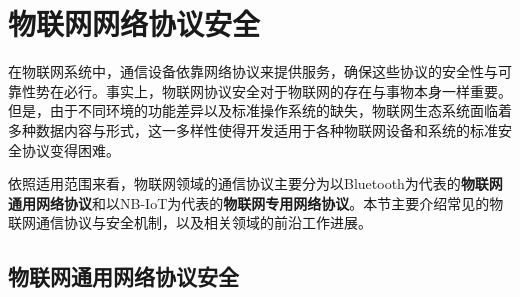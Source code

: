 \section{物联网网络协议安全}
\label{protocol_security}

\par 在物联网系统中，通信设备依靠网络协议来提供服务，确保这些协议的安全性与可靠性势在必行。事实上，物联网协议安全对于物联网的存在与事物本身一样重要。但是，由于不同环境的功能差异以及标准操作系统的缺失，物联网生态系统面临着多种数据内容与形式，这一多样性使得开发适用于各种物联网设备和系统的标准安全协议变得困难。
\par 依照适用范围来看，物联网领域的通信协议主要分为以Bluetooth为代表的\textcolor{myblue}{\textbf{物联网通用网络协议}}和以NB-IoT为代表的\textcolor{myblue}{\textbf{物联网专用网络协议}}。本节主要介绍常见的物联网通信协议与安全机制，以及相关领域的前沿工作进展。

\subsection{物联网通用网络协议安全}
\label{common_security}

